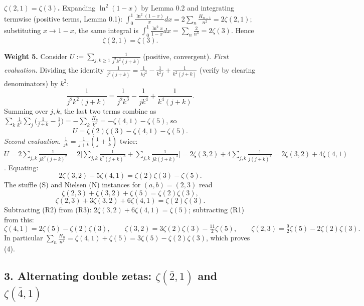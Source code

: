 \documentclass[11pt]{article}
\theoremstyle{remark}
\begin{document}
\textbf{$\zeta(2,1)=\zeta(3)$.} Expanding $\ln^2(1-x)$ by Lemma 0.2 and integrating termwise
(positive terms, Lemma 0.1): $\int_0^1\frac{\ln^2(1-x)}{x}dx=2\sum_n\frac{H_{n-1}}{n^2}=2\zeta(2,1)$;
substituting $x\to1-x$, the same integral is $\int_0^1\frac{\ln^2x}{1-x}dx=\sum_n\frac{2}{n^3}=2\zeta(3)$.
Hence
\begin{equation}
\zeta(2,1)=\zeta(3). \tag{6}
\end{equation}

\textbf{Weight 5.} Consider $U:=\sum_{j,k\ge1}\frac{1}{j^2k^2(j+k)}$ (positive, convergent).
\textit{First evaluation.} Dividing the identity
$\frac{1}{j^2(j+k)}=\frac{1}{kj^2}-\frac{1}{k^2j}+\frac{1}{k^2(j+k)}$ (verify by clearing
denominators) by $k^2$:
\[
\frac{1}{j^2k^2(j+k)}=\frac{1}{j^2k^3}-\frac{1}{jk^4}+\frac{1}{k^4(j+k)} .
\]
Summing over $j,k$, the last two terms combine as
$\sum_k\frac1{k^4}\sum_j\big(\frac{1}{j+k}-\frac1j\big)=-\sum_k\frac{H_k}{k^4}
=-\zeta(4,1)-\zeta(5)$, so
\[
U=\zeta(2)\zeta(3)-\zeta(4,1)-\zeta(5).
\]
\textit{Second evaluation.} $\frac{1}{jk}=\frac1{j+k}(\frac1j+\frac1k)$ twice:
$U=2\sum_{j,k}\frac{1}{jk^2(j+k)^2}=2\Big[\sum_{j,k}\frac{1}{k^2(j+k)^3}
+\sum_{j,k}\frac{1}{jk(j+k)^3}\Big]
=2\zeta(3,2)+4\sum_{j,k}\frac{1}{j(j+k)^4}=2\zeta(3,2)+4\zeta(4,1)$.
Equating:
\begin{equation}
2\zeta(3,2)+5\zeta(4,1)=\zeta(2)\zeta(3)-\zeta(5). \tag{R1}
\end{equation}
The stuffle (S) and Nielsen (N) instances for $(a,b)=(2,3)$ read
\begin{equation}
\zeta(2,3)+\zeta(3,2)+\zeta(5)=\zeta(2)\zeta(3), \tag{R2}
\end{equation}
\begin{equation}
\zeta(2,3)+3\zeta(3,2)+6\zeta(4,1)=\zeta(2)\zeta(3). \tag{R3}
\end{equation}
Subtracting (R2) from (R3): $2\zeta(3,2)+6\zeta(4,1)=\zeta(5)$; subtracting (R1) from this:
\begin{equation}
\zeta(4,1)=2\zeta(5)-\zeta(2)\zeta(3),\qquad
\zeta(3,2)=3\zeta(2)\zeta(3)-\tfrac{11}{2}\zeta(5),\qquad
\zeta(2,3)=\tfrac92\zeta(5)-2\zeta(2)\zeta(3). \tag{7}
\end{equation}
In particular $\sum_n\frac{H_n}{n^4}=\zeta(4,1)+\zeta(5)=3\zeta(5)-\zeta(2)\zeta(3)$, which proves (4).

\subsection*{3. Alternating double zetas: $\zeta(\bar2,1)$ and $\zeta(\bar4,1)$}
\end{document}
